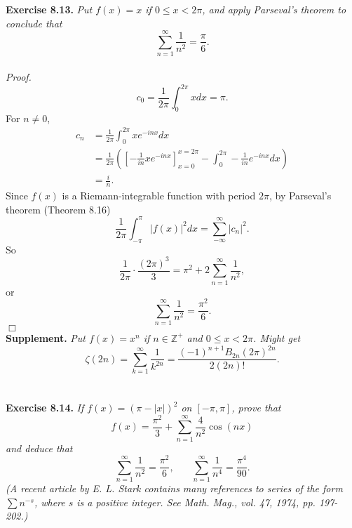 \documentclass{article}
\begin{document}
\textbf{Exercise 8.13.}
\emph{Put $f(x) = x$ if $0 \leq x < 2 \pi$, and apply Parseval's theorem to conclude that
$$\sum_{n = 1}^{\infty} \frac{1}{n^2} = \frac{\pi}{6}.$$} \\

\emph{Proof.}
\[
  c_0
  = \frac{1}{2 \pi} \int_{0}^{2 \pi} x dx
  = \pi.
\]
For $n \neq 0$,
\begin{align*}
c_n
&= \frac{1}{2 \pi} \int_{0}^{2 \pi} x e^{-inx} dx \\
&= \frac{1}{2 \pi} \left(
\left[ - \frac{1}{i n} x e^{-inx} \right]_{x = 0}^{x = 2 \pi}
- \int_{0}^{2 \pi} - \frac{1}{i n} e^{-inx} dx \right) \\
&= \frac{i}{n}.
\end{align*}
Since $f(x)$ is a Riemann-integrable function with period $2 \pi$,
by Parseval's theorem (Theorem 8.16)
$$\frac{1}{2 \pi} \int_{-\pi}^\pi |f(x)|^2 dx = \sum_{-\infty}^{\infty} |c_n|^2.$$
So
$$\frac{1}{2 \pi} \cdot \frac{(2 \pi)^3}{3}
= \pi^2 + 2 \sum_{n = 1}^{\infty} \frac{1}{n^2}, $$
or
$$\sum_{n = 1}^{\infty} \frac{1}{n^2}
= \frac{\pi^2}{6}.$$
$\Box$ \\



\textbf{Supplement.} \emph{
Put $f(x) = x^n$ if $n \in \mathbb{Z}^+$ and $0 \leq x < 2 \pi$.
Might get
\[
  \zeta(2n)
  = \sum_{k = 1}^{\infty} \frac{1}{k^{2n}}
  = \frac{(-1)^{n+1} B_{2n} (2\pi)^{2n}}{2(2n)!}.
\]} \\\\






\textbf{Exercise 8.14.}
\emph{If $f(x)=(\pi-|x|)^2$ on $[-\pi,\pi]$, prove that
\[
  f(x) = \frac{\pi^2}{3} + \sum_{n=1}^{\infty} \frac{4}{n^2} \cos(nx)
\]
and deduce that
\[
  \sum_{n=1}^{\infty} \frac{1}{n^2} = \frac{\pi^2}{6},
  \:\:\:\:\:\:\:\:
  \sum_{n=1}^{\infty} \frac{1}{n^4} = \frac{\pi^4}{90}.
\]
(A recent article by E. L. Stark contains many references to series of the form
$\sum n^{-s}$, where $s$ is a positive integer.
See Math. Mag., vol. 47, 1974, pp. 197-202.)} \\
\end{document}
